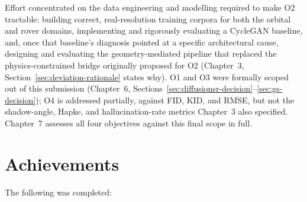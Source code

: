 Effort concentrated on the data engineering and modelling required to make O2 tractable: building correct, real-resolution training corpora for both the orbital and rover domains, implementing and rigorously evaluating a CycleGAN baseline, and, once that baseline's diagnosis pointed at a specific architectural cause, designing and evaluating the geometry-mediated pipeline that replaced the physics-constrained bridge originally proposed for O2 (Chapter~3, Section~\ref{sec:deviation-rationale} states why). O1 and O3 were formally scoped out of this submission (Chapter~6, Sections~\ref{sec:diffusionsr-decision}--\ref{sec:gs-decision}); O4 is addressed partially, against FID, KID, and RMSE, but not the shadow-angle, Hapke, and hallucination-rate metrics Chapter~3 also specified. Chapter~7 assesses all four objectives against this final scope in full.

\section{Achievements}

The following was completed:

